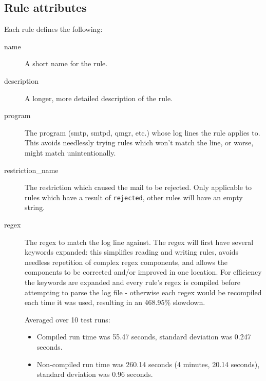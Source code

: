 \documentclass[a4paper,12pt,draft]{article}
\begin{document}
\subsection{Rule attributes}

Each rule defines the following:

\begin{description}

    \item [name] A short name for the rule.

    \item [description] A longer, more detailed description of the rule.

    \item [program] The program (smtp, smtpd, qmgr, etc.) whose log lines
        the rule applies to.  This avoids needlessly trying rules which
        won't match the line, or worse, might match unintentionally.

    \item [restriction\_name] The restriction which caused the mail to be
        rejected.  Only applicable to rules which have a result of
        \texttt{rejected}, other rules will have an empty string.

    \item [regex] The regex to match the log line against.  The regex will
        first have several keywords expanded: this simplifies reading and
        writing rules, avoids needless repetition of complex regex
        components, and allows the components to be corrected and/or
        improved in one location.  For efficiency the keywords are expanded
        and every rule's regex is compiled before attempting to parse the
        log file - otherwise each regex would be recompiled each time it
        was used, resulting in an 468.95\% slowdown.

        Averaged over 10 test runs:

        \begin{itemize} 

            \item Compiled run time was 55.47 seconds, standard deviation
                was 0.247 seconds.

            \item Non-compiled run time was 260.14 seconds (4 minutes,
                20.14 seconds), standard deviation was 0.96 seconds.

        \end{itemize}


\end{description}
\end{document}
